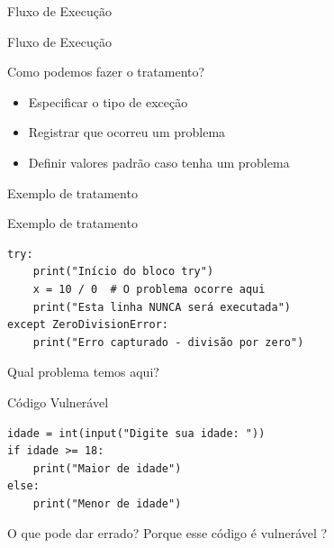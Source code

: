 \begin{frame}{Fluxo de Execução}

    \begin{exampleblock}{Fluxo de Execução}
        \centering
    \end{exampleblock}

    \begin{alertblock}{Como podemos fazer o tratamento?}
        \begin{itemize}
            \item Especificar o tipo de exceção
            \item Registrar que ocorreu um problema
            \item Definir valores padrão caso tenha um problema
        \end{itemize}
    \end{alertblock}
\end{frame}

\begin{frame}[fragile]{Exemplo  de tratamento}
    \begin{block}{Exemplo de tratamento}
        \begin{verbatim}
try:
    print("Início do bloco try")
    x = 10 / 0  # O problema ocorre aqui
    print("Esta linha NUNCA será executada")
except ZeroDivisionError:
    print("Erro capturado - divisão por zero")
\end{verbatim}
    \end{block}




\end{frame}

\begin{frame}[fragile]{Qual problema temos aqui?}
    \begin{block}{Código Vulnerável}
        \begin{verbatim}
idade = int(input("Digite sua idade: "))
if idade >= 18:
    print("Maior de idade")
else:
    print("Menor de idade")
\end{verbatim}
    \end{block}

    \begin{alertblock}{O que pode dar errado?}
        Porque esse código é vulnerável ?
    \end{alertblock}


\end{frame}

